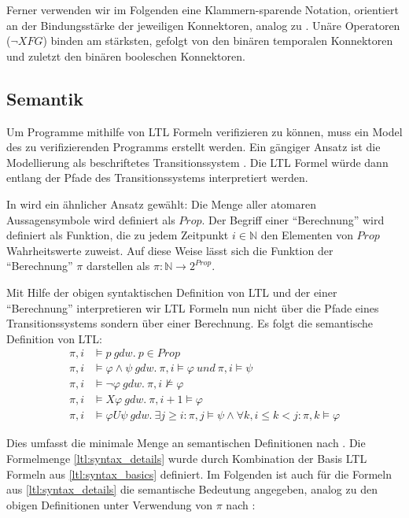 Ferner verwenden wir im Folgenden eine Klammern-sparende Notation, orientiert an der Bindungsstärke der jeweiligen Konnektoren, analog zu \cite{huth+04}. Unäre Operatoren ($\lnot X F G$) binden am stärksten, gefolgt von den binären temporalen Konnektoren und zuletzt den binären booleschen Konnektoren.


\subsection{Semantik}
\label{ltl:semantik}

Um Programme mithilfe von LTL Formeln verifizieren zu können, muss ein Model des zu verifizierenden Programms erstellt werden. Ein gängiger Ansatz ist die Modellierung als beschriftetes Transitionssystem \cite{huth+04}. Die LTL Formel würde dann entlang der Pfade des Transitionssystems interpretiert werden. 

In \cite{vardi+96} wird ein ähnlicher Ansatz gewählt: Die Menge aller atomaren Aussagensymbole wird definiert als $Prop$. Der Begriff einer "`Berechnung"' wird definiert als Funktion, die zu jedem Zeitpunkt $i \in \mathbb{N}$ den Elementen von $Prop$ Wahrheitswerte zuweist. Auf diese Weise lässt sich die Funktion der "`Berechnung"' $\pi$ darstellen als $\pi : \mathbb{N} \rightarrow 2^{Prop}$. 

Mit Hilfe der obigen syntaktischen Definition von LTL und der einer "`Berechnung"' interpretieren wir LTL Formeln nun nicht über die Pfade eines Transitionssystems sondern über einer Berechnung. Es folgt die semantische Definition von LTL: 
\begin{equation*}
\begin{split}
    \pi, i &\models p\ gdw.\ p \in Prop\\
    \pi, i &\models \varphi \land \psi\ gdw.\ \pi, i \models \varphi\ und\ \pi, i \models \psi\\
    \pi, i &\models \lnot\varphi\ gdw.\ \pi, i \not\models \varphi\\
    \pi, i &\models X\varphi\ gdw.\ \pi, i+1 \models \varphi\\
    \pi, i &\models \varphi U\psi\ gdw.\ \exists j \geq i: \pi, j \models \psi \land \forall k, i\leq k<j: \pi, k \models \varphi
\end{split}
\end{equation*}

Dies umfasst die minimale Menge an semantischen Definitionen nach \cite{vardi+96}. Die Formelmenge \ref{ltl:syntax_details} wurde durch Kombination der Basis LTL Formeln aus \ref{ltl:syntax_basics} definiert. Im Folgenden ist auch für die Formeln aus \ref{ltl:syntax_details} die semantische Bedeutung angegeben, analog zu den obigen Definitionen unter Verwendung von $\pi$ nach \cite{vardi+96}:


